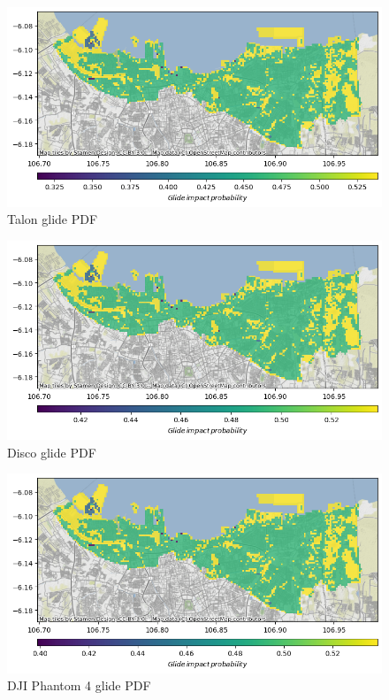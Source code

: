 \documentclass[12pt]{report}
\begin{document}
        \begin{figure}[H]
            \centering
            \includegraphics[width=\textwidth]{Plot/talon/glide_pdf.png}
            \caption{Talon glide PDF}
            \label{fig:talon_glide}
        \end{figure}
        \begin{figure}[H]
            \centering
            \includegraphics[width=\textwidth]{Plot/parrot/glide_pdf.png}
            \caption{Disco glide PDF}
            \label{fig:disco_glide}
        \end{figure}
        \begin{figure}[H]
            \centering
            \includegraphics[width=\textwidth]{Plot/phantom4/glide_pdf.png}
            \caption{DJI Phantom 4 glide PDF}
            \label{fig:phantom_glide}
        \end{figure}
\end{document}
